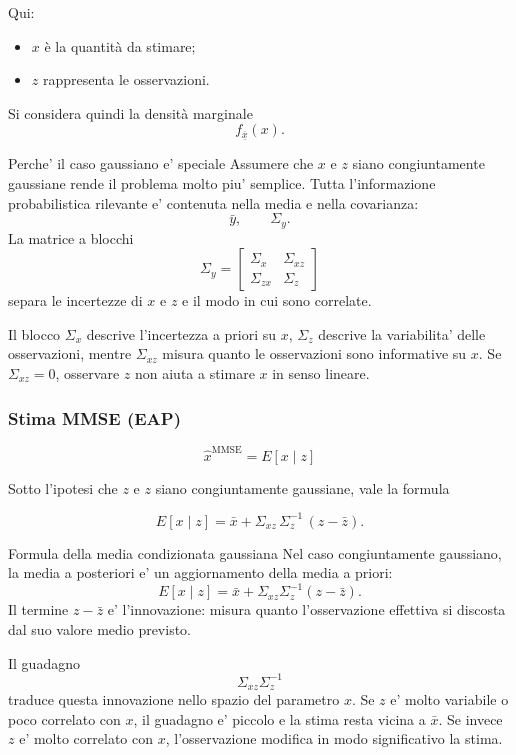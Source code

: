 \documentclass[11pt,a4paper]{article}
\begin{document}
Qui:
\begin{itemize}
    \item \(x\) è la quantità da stimare;
    \item \(z\) rappresenta le osservazioni.
\end{itemize}

Si considera quindi la densità marginale
\[
f_{\overline{\underline{x}}}(x).
\]

\begin{spiegazione}{Perche' il caso gaussiano e' speciale}
Assumere che $x$ e $z$ siano congiuntamente gaussiane rende il problema molto piu' semplice. Tutta l'informazione probabilistica rilevante e' contenuta nella media e nella covarianza:
\[
\bar y,
\qquad
\Sigma_y.
\]
La matrice a blocchi
\[
\Sigma_y=
\begin{bmatrix}
\Sigma_x & \Sigma_{xz}\\
\Sigma_{zx} & \Sigma_z
\end{bmatrix}
\]
separa le incertezze di $x$ e $z$ e il modo in cui sono correlate.

Il blocco $\Sigma_x$ descrive l'incertezza a priori su $x$, $\Sigma_z$ descrive la variabilita' delle osservazioni, mentre $\Sigma_{xz}$ misura quanto le osservazioni sono informative su $x$. Se $\Sigma_{xz}=0$, osservare $z$ non aiuta a stimare $x$ in senso lineare.
\end{spiegazione}

\subsubsection*{Stima MMSE (EAP)}

\[
\hat x^{\mathrm{MMSE}} = E[x\mid z]
\]

Sotto l'ipotesi che \(z\) e \(z\) siano congiuntamente gaussiane, vale la formula

\[
E[x\mid z]
=
\bar x
+
\Sigma_{xz}\,\Sigma_z^{-1}\,(z-\bar z).
\]

\begin{spiegazione}{Formula della media condizionata gaussiana}
Nel caso congiuntamente gaussiano, la media a posteriori e' un aggiornamento della media a priori:
\[
E[x\mid z]
=
\bar x+\Sigma_{xz}\Sigma_z^{-1}(z-\bar z).
\]
Il termine $z-\bar z$ e' l'innovazione: misura quanto l'osservazione effettiva si discosta dal suo valore medio previsto.

Il guadagno
\[
\Sigma_{xz}\Sigma_z^{-1}
\]
traduce questa innovazione nello spazio del parametro $x$. Se $z$ e' molto variabile o poco correlato con $x$, il guadagno e' piccolo e la stima resta vicina a $\bar x$. Se invece $z$ e' molto correlato con $x$, l'osservazione modifica in modo significativo la stima.
\end{spiegazione}
\end{document}
